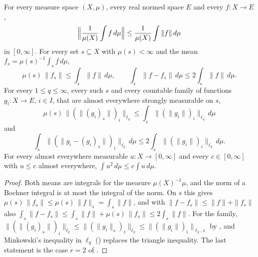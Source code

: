 \begin{lemma}
\label{lem:norm-mean-square-bound}
\leanok
{}
For every measure space $(X, \mu)$, every real normed space $E$ and every $f : X \to E$,
\[
  \Bigl\| \frac{1}{\mu(X)} \int f \, d\mu \Bigr\| \leq \frac{1}{\mu(X)} \int \|f\| \, d\mu
\]
in $[0, \infty]$. For every set $s \subseteq X$ with $\mu(s) < \infty$ and the mean
$f_s = \mu(s)^{-1} \int_s f \, d\mu$,
\[
  \mu(s) \, \|f_s\| \leq \int_s \|f\| \, d\mu ,
  \qquad
  \int_s \|f - f_s\| \, d\mu \leq 2 \int_s \|f\| \, d\mu .
\]
For every $1 \leq q \leq \infty$, every such $s$ and every countable family of functions
$g_i : X \to E$, $i \in I$, that are almost everywhere strongly measurable on $s$,
\[
  \mu(s) \, \|(\|(g_i)_s\|)_i\|_{\ell_q} \leq \int_s \|(\|g_i\|)_i\|_{\ell_q} \, d\mu
\]
and
\[
  \int_s \|(\|g_i - (g_i)_s\|)_i\|_{\ell_q} \, d\mu \leq 2 \int_s \|(\|g_i\|)_i\|_{\ell_q} \, d\mu .
\]
For every almost everywhere measurable $u : X \to [0, \infty]$ and every
$c \in [0, \infty]$ with $u \leq c$ almost everywhere, $\int u^2 \, d\mu \leq c \int u \, d\mu$.
\end{lemma}

\begin{proof}
\leanok
Both means are integrals for the measure $\mu(X)^{-1} \mu$, and the norm of a Bochner integral
is at most the integral of the norm. On $s$ this gives
$\mu(s) \, \|f_s\| \leq \mu(s) \, \|f\|_s = \int_s \|f\|$, and with
$\|f - f_s\| \leq \|f\| + \|f_s\|$ also
$\int_s \|f - f_s\| \leq \int_s \|f\| + \mu(s) \, \|f_s\| \leq 2 \int_s \|f\|$. For the family,
$\|(\|(g_i)_s\|)_i\|_{\ell_q} \leq \|(\|g_i\|_s)_i\|_{\ell_q} \leq \|(\|g_i\|)_i\|_{\ell_q, s}$ by
, and Minkowski's inequality in $\ell_q$ () replaces
the triangle inequality. The last statement is the case $r = 2$ of
.
\end{proof}

